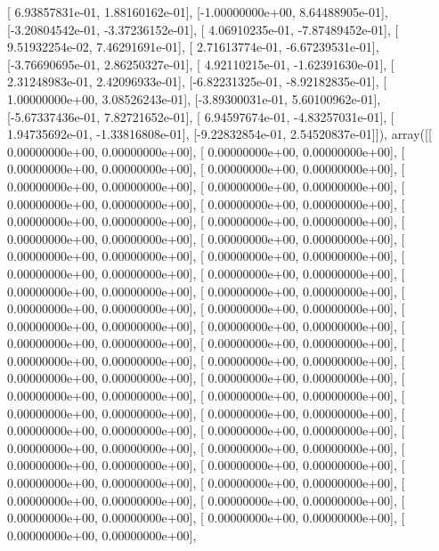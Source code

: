 \documentclass{article}
\begin{document}
       [ 6.93857831e-01,  1.88160162e-01],
       [-1.00000000e+00,  8.64488905e-01],
       [-3.20804542e-01, -3.37236152e-01],
       [ 4.06910235e-01, -7.87489452e-01],
       [ 9.51932254e-02,  7.46291691e-01],
       [ 2.71613774e-01, -6.67239531e-01],
       [-3.76690695e-01,  2.86250327e-01],
       [ 4.92110215e-01, -1.62391630e-01],
       [ 2.31248983e-01,  2.42096933e-01],
       [-6.82231325e-01, -8.92182835e-01],
       [ 1.00000000e+00,  3.08526243e-01],
       [-3.89300031e-01,  5.60100962e-01],
       [-5.67337436e-01,  7.82721652e-01],
       [ 6.94597674e-01, -4.83257031e-01],
       [ 1.94735692e-01, -1.33816808e-01],
       [-9.22832854e-01,  2.54520837e-01]]), array([[ 0.00000000e+00,  0.00000000e+00],
       [ 0.00000000e+00,  0.00000000e+00],
       [ 0.00000000e+00,  0.00000000e+00],
       [ 0.00000000e+00,  0.00000000e+00],
       [ 0.00000000e+00,  0.00000000e+00],
       [ 0.00000000e+00,  0.00000000e+00],
       [ 0.00000000e+00,  0.00000000e+00],
       [ 0.00000000e+00,  0.00000000e+00],
       [ 0.00000000e+00,  0.00000000e+00],
       [ 0.00000000e+00,  0.00000000e+00],
       [ 0.00000000e+00,  0.00000000e+00],
       [ 0.00000000e+00,  0.00000000e+00],
       [ 0.00000000e+00,  0.00000000e+00],
       [ 0.00000000e+00,  0.00000000e+00],
       [ 0.00000000e+00,  0.00000000e+00],
       [ 0.00000000e+00,  0.00000000e+00],
       [ 0.00000000e+00,  0.00000000e+00],
       [ 0.00000000e+00,  0.00000000e+00],
       [ 0.00000000e+00,  0.00000000e+00],
       [ 0.00000000e+00,  0.00000000e+00],
       [ 0.00000000e+00,  0.00000000e+00],
       [ 0.00000000e+00,  0.00000000e+00],
       [ 0.00000000e+00,  0.00000000e+00],
       [ 0.00000000e+00,  0.00000000e+00],
       [ 0.00000000e+00,  0.00000000e+00],
       [ 0.00000000e+00,  0.00000000e+00],
       [ 0.00000000e+00,  0.00000000e+00],
       [ 0.00000000e+00,  0.00000000e+00],
       [ 0.00000000e+00,  0.00000000e+00],
       [ 0.00000000e+00,  0.00000000e+00],
       [ 0.00000000e+00,  0.00000000e+00],
       [ 0.00000000e+00,  0.00000000e+00],
       [ 0.00000000e+00,  0.00000000e+00],
       [ 0.00000000e+00,  0.00000000e+00],
       [ 0.00000000e+00,  0.00000000e+00],
       [ 0.00000000e+00,  0.00000000e+00],
       [ 0.00000000e+00,  0.00000000e+00],
       [ 0.00000000e+00,  0.00000000e+00],
       [ 0.00000000e+00,  0.00000000e+00],
       [ 0.00000000e+00,  0.00000000e+00],
       [ 0.00000000e+00,  0.00000000e+00],
       [ 0.00000000e+00,  0.00000000e+00],
       [ 0.00000000e+00,  0.00000000e+00],
       [ 0.00000000e+00,  0.00000000e+00],
       [ 0.00000000e+00,  0.00000000e+00],
\end{document}
